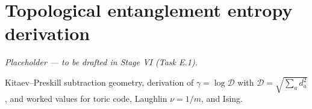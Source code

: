 \chapter{Topological entanglement entropy derivation}\label{app:tee}

\emph{Placeholder --- to be drafted in Stage VI (Task E.1).}

Kitaev--Preskill subtraction geometry, derivation of $\gamma = \log \mathcal{D}$ with $\mathcal{D} = \sqrt{\sum_a d_a^2}$, and worked values for toric code, Laughlin $\nu = 1/m$, and Ising.

